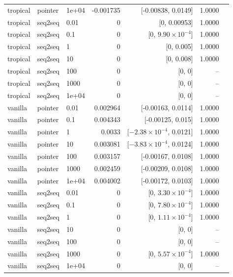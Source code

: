 \documentclass[10pt]{article}
\begin{document}
{\begin{longtable}{lllrrrl}
tropical & pointer & 1e+04 & -0.001735 & [-0.00838, 0.0149] & 1.0000 & \\
tropical & seq2seq & 0.01 & 0 & [0, 0.00953] & 1.0000 & \\
tropical & seq2seq & 0.1 & 0 & [0, $9.90\times10^{-4}$] & 1.0000 & \\
tropical & seq2seq & 1 & 0 & [0, 0.005] & 1.0000 & \\
tropical & seq2seq & 10 & 0 & [0, 0.008] & 1.0000 & \\
tropical & seq2seq & 100 & 0 & [0, 0] & -- & \\
tropical & seq2seq & 1000 & 0 & [0, 0] & -- & \\
tropical & seq2seq & 1e+04 & 0 & [0, 0] & -- & \\
vanilla & pointer & 0.01 & 0.002964 & [-0.00163, 0.0114] & 1.0000 & \\
vanilla & pointer & 0.1 & 0.004343 & [-0.00125, 0.015] & 1.0000 & \\
vanilla & pointer & 1 & 0.0033 & [$-2.38\times10^{-4}$, 0.0121] & 1.0000 & \\
vanilla & pointer & 10 & 0.003081 & [$-3.83\times10^{-4}$, 0.0124] & 1.0000 & \\
vanilla & pointer & 100 & 0.003157 & [-0.00167, 0.0108] & 1.0000 & \\
vanilla & pointer & 1000 & 0.002459 & [-0.00209, 0.0108] & 1.0000 & \\
vanilla & pointer & 1e+04 & 0.004002 & [-0.00172, 0.0103] & 1.0000 & \\
vanilla & seq2seq & 0.01 & 0 & [0, $3.30\times10^{-4}$] & 1.0000 & \\
vanilla & seq2seq & 0.1 & 0 & [0, $7.80\times10^{-4}$] & 1.0000 & \\
vanilla & seq2seq & 1 & 0 & [0, $1.11\times10^{-4}$] & 1.0000 & \\
vanilla & seq2seq & 10 & 0 & [0, 0] & -- & \\
vanilla & seq2seq & 100 & 0 & [0, 0] & -- & \\
vanilla & seq2seq & 1000 & 0 & [0, $5.57\times10^{-4}$] & 1.0000 & \\
vanilla & seq2seq & 1e+04 & 0 & [0, 0] & -- & \\
\bottomrule
\end{longtable}
}
\end{document}
